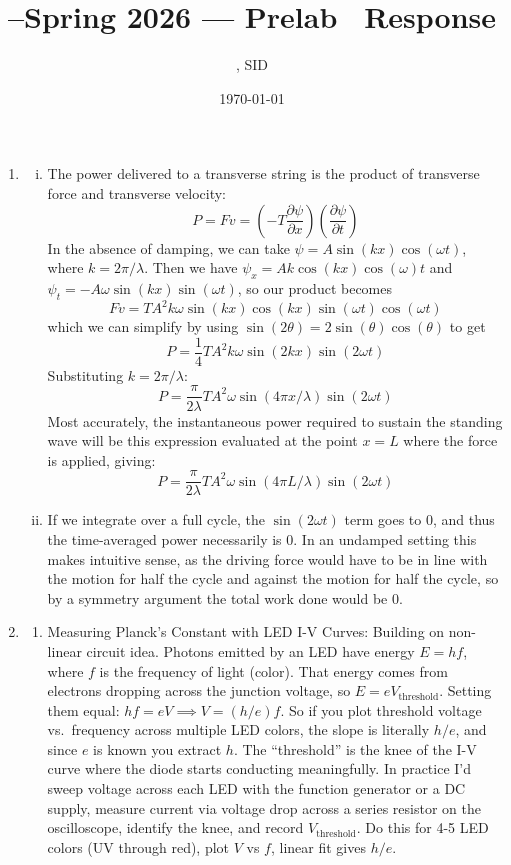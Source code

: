 \documentclass[11pt]{article}
\title{\Cls--Spring 2026 --- Prelab \Prelab \ Response}
\author{\Name, SID \SID}
\date{\today}
\begin{document}
\maketitle

\begin{enumerate}

    \item \begin{enumerate}[(i)]
              \item The power delivered to a transverse string is the product of transverse force and transverse velocity: \[P = Fv = \left(-T\frac{\partial\psi}{\partial x}\right)\left(\frac{\partial\psi}{\partial t}\right)\] In the absence of damping, we can take $\psi = A \sin(kx) \cos(\omega t)$, where $k = 2\pi / \lambda$. Then we have $\psi_x = Ak \cos(kx) \cos(\omega)t$ and $\psi_t = -A\omega \sin(kx) \sin(\omega t)$, so our product becomes \[Fv = TA^2k\omega \sin(kx)\cos(kx) \sin(\omega t) \cos(\omega t)\] which we can simplify by using $\sin(2\theta) = 2\sin(\theta) \cos (\theta)$ to get \[P = \frac{1}{4}TA^2 k \omega \sin(2kx) \sin(2 \omega t) \] Substituting $k = 2\pi/\lambda$: \[P = \frac{\pi}{2\lambda}TA^2 \omega \sin(4\pi x/\lambda) \sin(2 \omega t) \] Most accurately, the instantaneous power required to sustain the standing wave will be this expression evaluated at the point $x=L$ where the force is applied, giving: \[P = \frac{\pi}{2\lambda}TA^2 \omega \sin(4\pi L/\lambda) \sin(2 \omega t) \]
              \item If we integrate over a full cycle, the $\sin (2 \omega t)$ term goes to 0, and thus the time-averaged power necessarily is 0. In an undamped setting this makes intuitive sense, as the driving force would have to be in line with the motion for half the cycle and against the motion for half the cycle, so by a symmetry argument the total work done would be 0.
          \end{enumerate}
    \item \begin{enumerate}
              \item Measuring Planck's Constant with LED I-V Curves: Building on non-linear circuit idea. Photons emitted by an LED have energy $E = hf$, where $f$ is the frequency of light (color). That energy comes from electrons dropping across the junction voltage, so $E = eV_{\text{threshold}}$. Setting them equal: $hf = eV \implies V = (h/e)f$. So if you plot threshold voltage vs.\ frequency across multiple LED colors, the slope is literally $h/e$, and since $e$ is known you extract $h$. The ``threshold'' is the knee of the I-V curve where the diode starts conducting meaningfully. In practice I'd sweep voltage across each LED with the function generator or a DC supply, measure current via voltage drop across a series resistor on the oscilloscope, identify the knee, and record $V_{\text{threshold}}$. Do this for 4-5 LED colors (UV through red), plot $V$ vs $f$, linear fit gives $h/e$.


\end{enumerate}
\end{enumerate}
\end{document}
